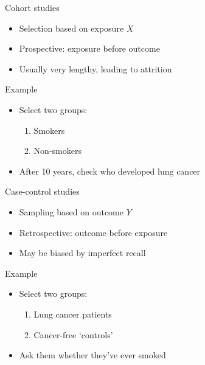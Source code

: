 \begin{frame}[t]{Cohort studies}
    \begin{itemize}
        \item Selection based on exposure $X$
        \item \alert{Prospective}: exposure before outcome
        \item Usually very lengthy, leading to attrition
    \end{itemize}
    \vfill
    \begin{block}{Example}
        \begin{itemize}
            \item Select two groups:
                  \begin{enumerate}
                      \item Smokers
                      \item Non\hyp{}smokers
                  \end{enumerate}
            \item After 10 years, check who developed lung cancer
        \end{itemize}
    \end{block}
\end{frame}

\begin{frame}[t]{Case-control studies}
    \begin{itemize}
        \item Sampling based on outcome $Y$
        \item \alert{Retrospective}: outcome before exposure
        \item May be biased by imperfect recall
    \end{itemize}
    \vfill
    \begin{block}{Example}
        \begin{itemize}
            \item Select two groups:
                  \begin{enumerate}
                      \item Lung cancer patients
                      \item Cancer\hyp{}free `controls'
                  \end{enumerate}
            \item Ask them whether they've ever smoked
        \end{itemize}
    \end{block}
\end{frame}

